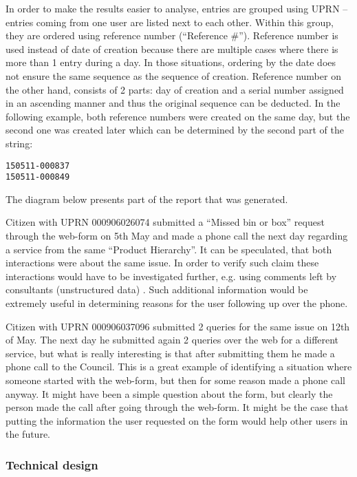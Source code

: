 In order to make the results easier to analyse, entries are grouped using UPRN – entries coming from one user are listed next to each other. Within this group, they are ordered using reference number (“Reference \#”). Reference number is used instead of date of creation because there are multiple cases where there is more than 1 entry during a day. In those situations, ordering by the date does not ensure the same sequence as the sequence of creation. Reference number on the other hand, consists of 2 parts: day of creation and a serial number assigned in an ascending manner and thus the original sequence can be deducted. In the following example, both reference numbers were created on the same day, but the second one was created later which can be determined by the second part of the string:
\begin{lstlisting}
150511-000837
150511-000849
\end{lstlisting}

The diagram below presents part of the report that was generated.

Citizen with UPRN 000906026074 submitted a “Missed bin or box” request through the web-form on 5th May and made a phone call the next day regarding a service from the same “Product Hierarchy”. It can be speculated, that both interactions were about the same issue. In order to verify such claim these interactions would have to be investigated further, e.g. using comments left by consultants (unstructured data) \citep{baars2008management}. Such additional information would be extremely useful in determining reasons for the user following up over the phone.

Citizen with UPRN 000906037096 submitted 2 queries for the same issue on 12th of May. The next day he submitted again 2 queries over the web for a different service, but what is really interesting is that after submitting them he made a phone call to the Council. This is a great example of identifying a situation where someone started with the web-form, but then for some reason made a phone call anyway. It might have been a simple question about the form, but clearly the person made the call after going through the web-form. It might be the case that putting the information the user requested on the form would help other users in the future.
		
			\subsubsection{Technical design}
			
